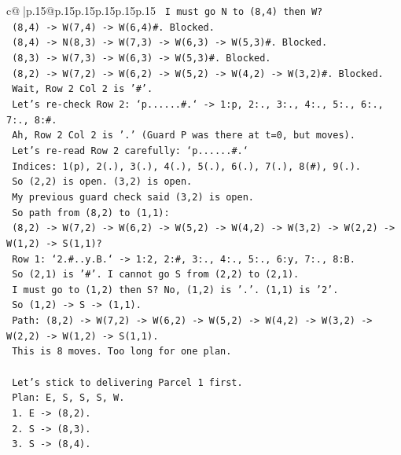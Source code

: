\documentclass{article}
\begin{document}
{\begin{supertabular}{c@{$\;$}|p{.15\linewidth}@{}p{.15\linewidth}p{.15\linewidth}p{.15\linewidth}p{.15\linewidth}p{.15\linewidth}}
{{{\texttt{   I must go N to (8,4) then W?} \\
\texttt{   (8,4) {-}> W(7,4) {-}> W(6,4)\#. Blocked.} \\
\texttt{   (8,4) {-}> N(8,3) {-}> W(7,3) {-}> W(6,3) {-}> W(5,3)\#. Blocked.} \\
\texttt{   (8,3) {-}> W(7,3) {-}> W(6,3) {-}> W(5,3)\#. Blocked.} \\
\texttt{   (8,2) {-}> W(7,2) {-}> W(6,2) {-}> W(5,2) {-}> W(4,2) {-}> W(3,2)\#. Blocked.} \\
\texttt{   Wait, Row 2 Col 2 is '\#'.} \\
\texttt{   Let's re{-}check Row 2: `p......\#.` {-}> 1:p, 2:., 3:., 4:., 5:., 6:., 7:., 8:\#.} \\
\texttt{   Ah, Row 2 Col 2 is '.' (Guard P was there at t=0, but moves).} \\
\texttt{   Let's re{-}read Row 2 carefully: `p......\#.`} \\
\texttt{   Indices: 1(p), 2(.), 3(.), 4(.), 5(.), 6(.), 7(.), 8(\#), 9(.).} \\
\texttt{   So (2,2) is open. (3,2) is open.} \\
\texttt{   My previous guard check said (3,2) is open.} \\
\texttt{   So path from (8,2) to (1,1):} \\
\texttt{   (8,2) {-}> W(7,2) {-}> W(6,2) {-}> W(5,2) {-}> W(4,2) {-}> W(3,2) {-}> W(2,2) {-}> W(1,2) {-}> S(1,1)?} \\
\texttt{   Row 1: `2.\#..y.B.` {-}> 1:2, 2:\#, 3:., 4:., 5:., 6:y, 7:., 8:B.} \\
\texttt{   So (2,1) is '\#'. I cannot go S from (2,2) to (2,1).} \\
\texttt{   I must go to (1,2) then S? No, (1,2) is '.'. (1,1) is '2'.} \\
\texttt{   So (1,2) {-}> S {-}> (1,1).} \\
\texttt{   Path: (8,2) {-}> W(7,2) {-}> W(6,2) {-}> W(5,2) {-}> W(4,2) {-}> W(3,2) {-}> W(2,2) {-}> W(1,2) {-}> S(1,1).} \\
\texttt{   This is 8 moves. Too long for one plan.} \\
\\ 
\texttt{   Let's stick to delivering Parcel 1 first.} \\
\texttt{   Plan: E, S, S, S, W.} \\
\texttt{   1. E {-}> (8,2).} \\
\texttt{   2. S {-}> (8,3).} \\
\texttt{   3. S {-}> (8,4).} \\
}}}
\end{supertabular}}
\end{document}
